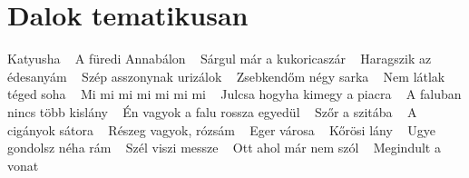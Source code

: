 \section*{Dalok tematikusan}
\footnotesize Katyusha \ \textbf{\pageref{a}} \newline
\footnotesize A füredi Annabálon \ \textbf{\pageref{BCrediAnnabC3A1lon}} \newline
\footnotesize Sárgul már a kukoricaszár \ \textbf{\pageref{rgulmC3A1rakukoricaszC3A1r}} \newline
\footnotesize Haragszik az édesanyám \ \textbf{\pageref{ikazC3A9desanyC3A1m}} \newline
\footnotesize Szép asszonynak urizálok \ \textbf{\pageref{9passzonynakurizC3A1lok}} \newline
\footnotesize Zsebkendőm négy sarka \ \textbf{\pageref{dC591mnC3A9gysarka}} \newline
\footnotesize Nem látlak téged soha \ \textbf{\pageref{3A1tlaktC3A9gedsoha}} \newline
\footnotesize Mi mi mi mi mi mi mi \ \textbf{\pageref{imimimimi}} \newline
\footnotesize Julcsa hogyha kimegy a piacra \ \textbf{\pageref{hogyhakimegyapiacra}} \newline
\footnotesize A faluban nincs több kislány \ \textbf{\pageref{annincstC3B6bbkislC3A1ny}} \newline
\footnotesize Én vagyok a falu rossza egyedül \ \textbf{\pageref{vagyokafalurosszaegyedC3BCl}} \newline
\footnotesize Szőr a szitába \ \textbf{\pageref{1raszitC3A1ba}} \newline
\footnotesize A cigányok sátora \ \textbf{\pageref{3A1nyoksC3A1tora}} \newline
\footnotesize Részeg vagyok, rózsám \ \textbf{\pageref{szegvagyok2CrC3B3zsC3A1m}} \newline
\footnotesize Eger városa \ \textbf{\pageref{C3A1rosa}} \newline
\footnotesize Kőrösi lány \ \textbf{\pageref{rC3B6silC3A1ny}} \newline
\footnotesize Ugye gondolsz néha rám \ \textbf{\pageref{ndolsznC3A9harC3A1m}} \newline
\footnotesize Szél viszi messze \ \textbf{\pageref{9lviszimessze}} \newline
\footnotesize Ott ahol már nem szól \ \textbf{\pageref{lmC3A1rnemszC3B3l}} \newline
\footnotesize Megindult a vonat \ \textbf{\pageref{ltavonat}} \newline
